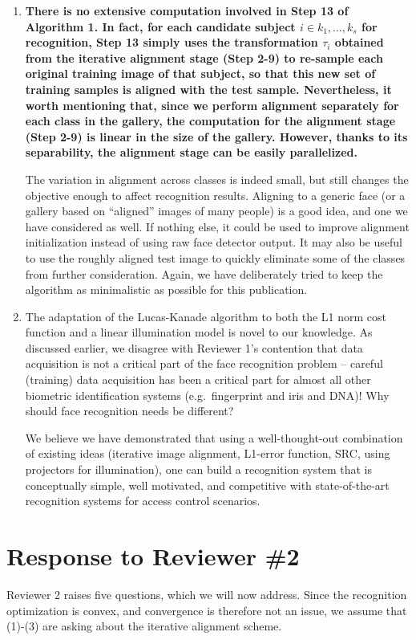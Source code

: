 \documentclass[11pt]{article}
\begin{document}
\begin{enumerate}
\item  {\bf There is no extensive computation involved in
    Step 13 of Algorithm 1. In fact, for each candidate
    subject $i\in {k_1, \ldots, k_s}$ for recognition, Step
    13 simply uses the transformation $\tau_i$ obtained
    from the iterative alignment stage (Step 2-9) to
    re-sample each original training
    image of that subject, so that this new set of training
    samples is aligned with the test sample. Nevertheless,
    it worth mentioning that, since we perform alignment
    separately for each class in the gallery, the
    computation for the alignment stage (Step 2-9) is
    linear in the size of the gallery. However, thanks to
    its separability, the alignment stage can be easily
    parallelized.}

    The variation in alignment across classes is indeed
    small, but still changes the objective enough to affect
    recognition results. Aligning to a generic face (or a
    gallery based on ``aligned'' images of many people) is
    a good idea, and one we have considered as well.  If
    nothing else, it could be used to improve alignment
    initialization instead of using raw face detector
    output.  It may also be useful to use the roughly
    aligned test image to quickly eliminate some of the
    classes from further consideration.  Again, we have
    deliberately tried to keep the algorithm as minimalistic
    as possible for this publication.

\item The adaptation of the Lucas-Kanade algorithm to both the L1 norm cost
function and a linear illumination model is novel to our knowledge.  As
discussed earlier, we disagree with Reviewer 1's contention that data
acquisition is not a critical part of the face recognition problem -- careful (training)
data acquisition has been a critical part for almost all other biometric identification
systems (e.g.\ fingerprint and iris and DNA)! Why should face recognition needs be different?

We believe we have demonstrated that using a well-thought-out combination of existing ideas
(iterative image alignment, L1-error function, SRC, using projectors for
illumination), one can build a recognition system that is conceptually simple, well
motivated, and competitive with state-of-the-art recognition systems for access
control scenarios.

\end{enumerate}

\section{Response to Reviewer \#2}
Reviewer 2 raises five questions, which we will now address.  Since the
recognition optimization is convex, and convergence is therefore not an issue, we assume
that (1)-(3) are asking about the iterative alignment scheme.
\end{document}

